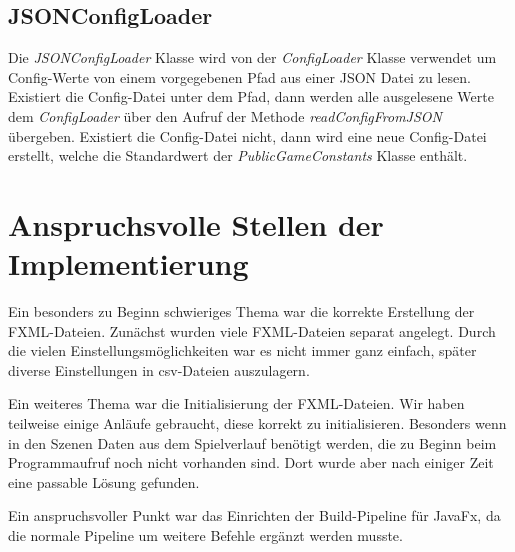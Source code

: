 \subsection{JSONConfigLoader}

Die \textit{JSONConfigLoader} Klasse wird von der \textit{ConfigLoader} Klasse verwendet um Config-Werte von einem vorgegebenen Pfad aus einer JSON Datei zu lesen. Existiert die Config-Datei unter dem Pfad, dann werden alle ausgelesene Werte dem \textit{ConfigLoader} über den Aufruf der Methode \textit{readConfigFromJSON} übergeben. Existiert die Config-Datei nicht, dann wird eine neue Config-Datei erstellt, welche die Standardwert der \textit{PublicGameConstants} Klasse enthält.

\section{Anspruchsvolle Stellen der Implementierung}

Ein besonders zu Beginn schwieriges Thema war die korrekte Erstellung der FXML-Dateien. Zunächst wurden viele FXML-Dateien separat  angelegt. Durch die vielen Einstellungsmöglichkeiten war es nicht immer ganz einfach, später diverse Einstellungen in csv-Dateien auszulagern. 

\medskip
Ein weiteres Thema war die Initialisierung der FXML-Dateien. Wir haben teilweise einige Anläufe gebraucht, diese korrekt zu initialisieren. Besonders wenn in den Szenen Daten aus dem Spielverlauf benötigt werden, die zu Beginn beim Programmaufruf noch nicht vorhanden sind. Dort wurde aber nach einiger Zeit eine passable Lösung gefunden. 

\medskip
Ein anspruchsvoller Punkt war das Einrichten der Build-Pipeline für JavaFx, da die normale Pipeline um weitere Befehle ergänzt werden musste.
